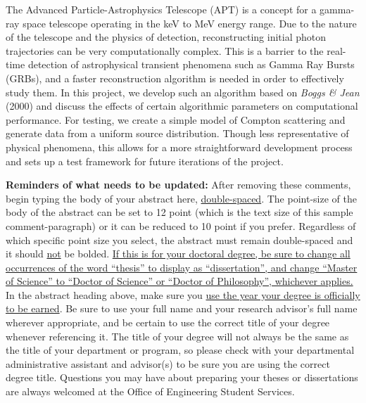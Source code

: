 \begin{thesisabstract}

The Advanced Particle-Astrophysics Telescope (APT) is a concept for a gamma-ray space telescope operating in the keV to MeV energy range. Due to the nature of the telescope and the physics of detection, reconstructing initial photon trajectories can be very computationally complex. This is a barrier to the real-time detection of astrophysical transient phenomena such as Gamma Ray Bursts (GRBs), and a faster reconstruction algorithm is needed in order to effectively study them. In this project, we develop such an algorithm based on \textit{Boggs \& Jean} (2000)\cite{Boggs} and discuss the effects of certain algorithmic parameters on computational performance. For testing, we create a simple model of Compton scattering and generate data from a uniform source distribution. Though less representative of physical phenomena, this allows for a more straightforward development process and sets up a test framework for future iterations of the project.

\iffalse

\textbf{Reminders of what needs to be updated:} 
After removing these comments, begin typing the body of your abstract here,
\uline{double-spaced}.  The point-size of the body of the abstract can be set to
12 point (which is the text size of this sample comment-paragraph) or it can be
reduced to 10 point if you prefer.  Regardless of which specific point size you
select, the abstract must remain double-spaced and it should \uline{not} be
bolded.  \uline{If this is for your doctoral degree, be sure to change all
occurrences of the word ``thesis'' to display as ``dissertation'', and change
``Master of Science'' to ``Doctor of Science'' or ``Doctor of Philosophy'',
whichever applies.}  In the abstract heading above, make sure you \uline{use
the year your degree is officially to be earned}.  Be sure to use your full
name and your research advisor's full name wherever appropriate, and be certain
to use the correct title of your degree whenever referencing it. The title of
your degree will not always be the same as the title of your department or
program, so please check with your departmental administrative assistant and
advisor(s) to be sure you are using the correct degree title.  Questions you
may have about preparing your theses or dissertations are always welcomed at
the Office of Engineering Student Services.


\end{thesisabstract}
